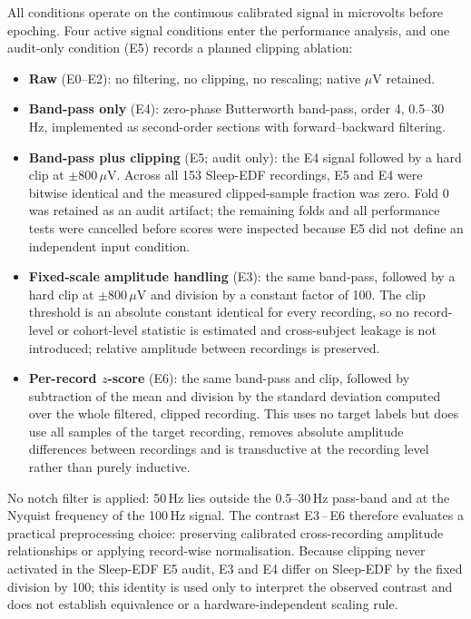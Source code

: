 \documentclass[11pt,a4paper]{article}
\begin{document}
\FloatBarrier

All conditions operate on the continuous calibrated signal in microvolts before epoching. Four active
signal conditions enter the performance analysis, and one audit-only condition (E5) records a planned
clipping ablation:

\begin{itemize}
\item \textbf{Raw} (E0--E2): no filtering, no clipping, no rescaling; native $\mu$V retained.
\item \textbf{Band-pass only} (E4): zero-phase Butterworth band-pass, order 4, 0.5--30\,Hz, implemented
as second-order sections with forward--backward filtering.
\item \textbf{Band-pass plus clipping} (E5; audit only): the E4 signal followed by a hard clip at
$\pm800\,\mu$V. Across all 153 Sleep-EDF recordings, E5 and E4 were bitwise identical and the measured
clipped-sample fraction was zero. Fold 0 was retained as an audit artifact; the remaining folds and all
performance tests were cancelled before scores were inspected because E5 did not define an independent
input condition.
\item \textbf{Fixed-scale amplitude handling} (E3): the same band-pass, followed by a hard clip at
$\pm800\,\mu$V and division by a constant factor of 100. The clip threshold is an absolute constant
identical for every recording, so no record-level or cohort-level statistic is estimated and
cross-subject leakage is not introduced; relative amplitude between recordings is preserved.
\item \textbf{Per-record $z$-score} (E6): the same band-pass and clip, followed by subtraction of the
mean and division by the standard deviation computed over the whole filtered, clipped recording. This
uses no target labels but does use all samples of the target recording, removes absolute amplitude
differences between recordings and is transductive at the recording level rather than purely inductive.
\end{itemize}

No notch filter is applied: 50\,Hz lies outside the 0.5--30\,Hz pass-band and at the Nyquist frequency
of the 100\,Hz signal. The contrast E3\,--\,E6 therefore evaluates a practical preprocessing choice:
preserving calibrated cross-recording amplitude relationships or applying record-wise normalisation.
Because clipping never activated in the Sleep-EDF E5 audit, E3 and E4 differ on Sleep-EDF by the fixed division by 100;
this identity is used only to interpret the observed contrast and does not establish equivalence or a
hardware-independent scaling rule.
\end{document}
